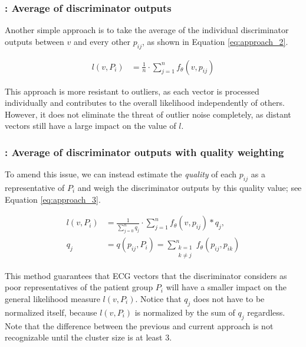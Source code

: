 \documentclass[preprint,12pt]{elsarticle}
\begin{document}
\subsubsection{\aB: Average of discriminator outputs}
Another simple approach is to take the average of the individual discriminator outputs between $v$ and every other $p_{ij}$, as shown in Equation \ref{eq:approach_2}.

\begin{equation}
    \begin{aligned}
        \label{eq:approach_2}
        l(v, P_i) & = \frac{1}{n} \cdot \sum_{j=1}^{n} f_\theta (v, p_{ij})
    \end{aligned}
\end{equation}

This approach is more resistant to outliers, as each vector is processed individually and contributes to the overall likelihood independently of others. However, it does not eliminate the threat of outlier noise completely, as distant vectors still have a large impact on the value of $l$. 

\subsubsection{\aC: Average of discriminator outputs with quality weighting}

To amend this issue, we can instead estimate the \textit{quality} of each $p_{ij}$ as a representative of $P_i$ and weigh the discriminator outputs by this quality value; see Equation \ref{eq:approach_3}. 

\begin{equation}
    \begin{aligned}
        \label{eq:approach_3}
        l(v, P_i) & = \frac{1}{\sum\limits_{j=0}^{n} q_j} \cdot \sum_{j=1}^{n} f_\theta (v, p_{ij}) * q_j, \\
        q_j & = q(p_{ij}, P_i) = \sum_{\substack{k = 1 \\ k \neq j}}^{n} f_\theta (p_{ij}, p_{ik})
    \end{aligned}
\end{equation}

This method guarantees that ECG vectors that the discriminator considers as poor representatives of the patient group $P_i$ will have a smaller impact on the general likelihood measure $l(v, P_i)$. Notice that $q_j$ does not have to be normalized itself, because $l(v, P_i)$ is normalized by the sum of $q_j$ regardless. Note that the difference between the previous and current approach is not recognizable until the cluster size is at least 3.
\end{document}
